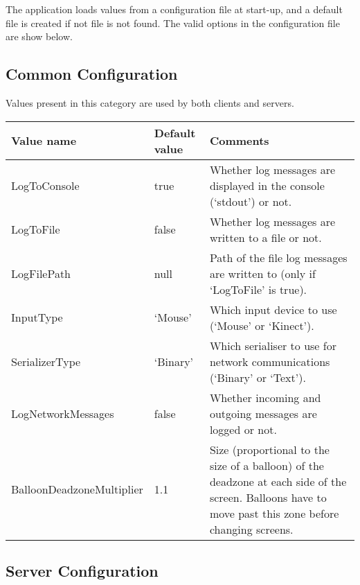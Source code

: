 The application loads values from a configuration file at start-up, and a default file is created if not file is not found.
The valid options in the configuration file are show below.

\subsection{Common Configuration}

Values present in this category are used by both clients and servers.

\begin{tabular}{|p{5.2cm}|p{2.8cm}|p{7.6cm}|}

\hline Value name & Default value & Comments \\ \hline

LogToConsole & true & Whether log messages are displayed in the console (`stdout') or not.  \\ \hline

LogToFile & false & Whether log messages are written to a file or not. \\ \hline

LogFilePath & null & Path of the file log messages are written to (only if `LogToFile' is true). \\ \hline

InputType & `Mouse' & Which input device to use (`Mouse' or `Kinect'). \\ \hline

SerializerType & `Binary' & Which serialiser to use for network communications (`Binary' or `Text'). \\ \hline

LogNetworkMessages & false & Whether incoming and outgoing messages are logged or not. \\ \hline

BalloonDeadzoneMultiplier & 1.1 & Size (proportional to the size of a balloon) of the deadzone at each side of the screen. Balloons have to move past this zone before changing screens. \\ \hline

\end{tabular}

\clearpage{}

\subsection{Server Configuration}

